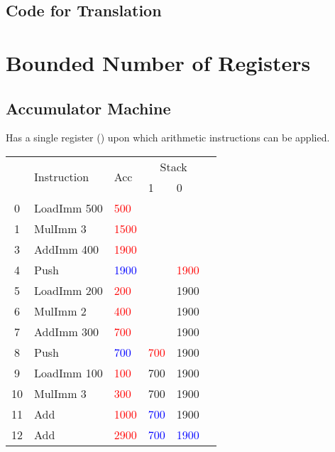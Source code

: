 \documentclass{report}
\newcommand{\hot}[1]{\textcolor{red}{#1}}
\newcommand{\old}[1]{\textcolor{blue}{#1}}
\begin{document}
\subsection*{Code for Translation}

\section*{Bounded Number of Registers}
\subsection*{Accumulator Machine}
Has a single register () upon which arithmetic instructions can be applied.
\begin{center}
	\begin{tabular}{c l | l l l | l}
		   & \multirow{2}{*}{Instruction} & \multirow{2}{*}{Acc} & \multicolumn{2}{c}{Stack}              \\
		   &                              &                      & 1                         & 0          \\
		\hline
		0  & LoadImm 500                  & \hot{500}            &                           &            \\
		1  & MulImm 3                     & \hot{1500}           &                           &            \\
		3  & AddImm 400                   & \hot{1900}           &                           &            \\
		4  & Push                         & \old{1900}           &                           & \hot{1900} \\
		5  & LoadImm 200                  & \hot{200}            &                           & 1900       \\
		6  & MulImm 2                     & \hot{400}            &                           & 1900       \\
		7  & AddImm 300                   & \hot{700}            &                           & 1900       \\
		8  & Push                         & \old{700}            & \hot{700}                 & 1900       \\
		9  & LoadImm 100                  & \hot{100}            & 700                       & 1900       \\
		10 & MulImm 3                     & \hot{300}            & 700                       & 1900       \\
		11 & Add                          & \hot{1000}           & \old{700}                 & 1900       \\
		12 & Add                          & \hot{2900}           & \old{700}                 & \old{1900} \\
	\end{tabular}
\end{center}
\end{document}
